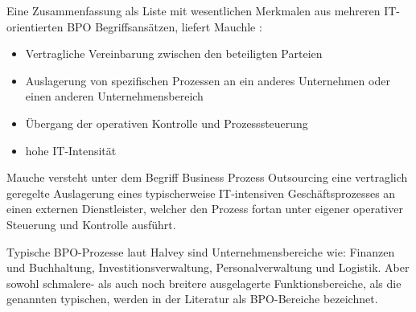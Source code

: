 Eine Zusammenfassung als Liste mit wesentlichen Merkmalen aus mehreren IT-orientierten BPO Begriffsansätzen, liefert Mauchle \cite[6]{mauchle2012business}:
\begin{itemize}
\item Vertragliche Vereinbarung zwischen den beteiligten Parteien
\item Auslagerung von spezifischen Prozessen an ein anderes Unternehmen oder einen anderen Unternehmensbereich
\item Übergang der operativen Kontrolle und Prozesssteuerung
\item hohe IT-Intensität
\end{itemize}
Mauche versteht unter dem Begriff Business Prozess Outsourcing eine vertraglich geregelte Auslagerung eines typischerweise IT-intensiven Geschäftsprozesses an einen externen Dienstleister, welcher den Prozess fortan unter eigener operativer Steuerung und Kontrolle ausführt.
\cite[3]{mauchle2012business}

Typische BPO-Prozesse laut Halvey sind Unternehmensbereiche wie: Finanzen und Buchhaltung, Investitionsverwaltung, Personalverwaltung und Logistik. Aber sowohl schmalere- als auch noch breitere ausgelagerte Funktionsbereiche, als die genannten typischen, werden in der Literatur als BPO-Bereiche bezeichnet. \cite[4]{halvey2007business}
 







